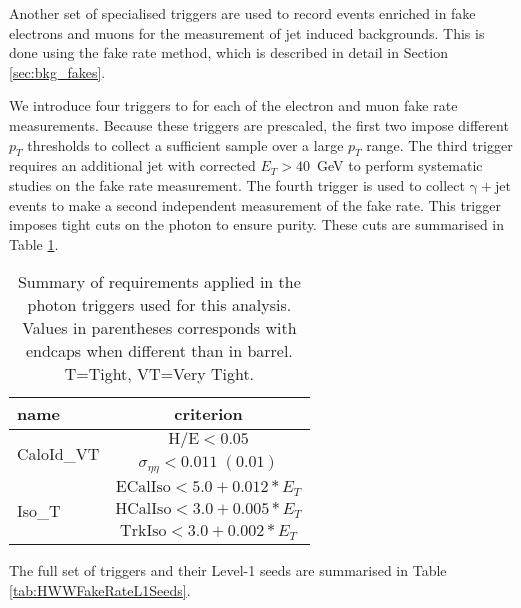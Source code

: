 Another set of specialised triggers are used to record events
enriched in fake electrons and muons for the measurement of jet induced backgrounds.
This is done using the fake rate method, which is described in detail in
Section \ref{sec:bkg_fakes}.

We introduce four triggers to for each of the electron and muon fake rate measurements.
Because these triggers are prescaled, the first two impose different $p_T$ thresholds 
to collect a sufficient sample over a large $p_T$ range.
The third trigger requires an additional jet with corrected $E_{T}>40$~GeV
to perform systematic studies on the fake rate measurement.
The fourth trigger is used to collect $\mathrm{\gamma+jet}$ events to
make a second independent measurement of the fake rate.
This trigger imposes tight cuts on the photon to ensure purity.
These cuts are summarised in Table \ref{tab:PhotonPlusLeptonTriggerCuts}.

\begin{table}[htb]
 \caption{Summary of requirements applied in the photon triggers used for this analysis. 
Values in parentheses corresponds with endcaps when different than in barrel. T=Tight, VT=Very Tight.}
    \vspace{5pt}
  \label{tab:PhotonPlusLeptonTriggerCuts}
  \centering
  \begin{tabular}{l||c}
    \hline
    name                        &  criterion \\
    \hline \hline
    \multirow{2}{*}{CaloId\_VT} & $\mathrm{H/E < 0.05 }$ \\
                                & $\sigma_{\eta\eta}\mathrm{< 0.011\;(0.01)}$ \\
    \hline \hline
    \multirow{3}{*}{Iso\_T}     & $\mathrm{ECalIso} < 5.0 + 0.012*E_{T} $ \\
                                & $\mathrm{HCalIso} < 3.0 + 0.005*E_{T} $ \\
                                & $\mathrm{TrkIso}  < 3.0 + 0.002*E_{T} $ \\
    \hline
  \end{tabular}
\end{table}

The full set of triggers and their Level-1 seeds are summarised in 
Table \ref{tab:HWWFakeRateL1Seeds}. 


